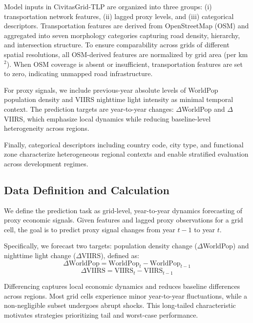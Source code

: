 \documentclass[11pt,conference,onecolumn]{IEEEtran}
\begin{document}
Model inputs in CivitasGrid-TLP are organized into three groups: (i) transportation network features, (ii) lagged proxy levels, and (iii) categorical descriptors. Transportation features are derived from OpenStreetMap (OSM) and aggregated into seven morphology categories capturing road density, hierarchy, and intersection structure. To ensure comparability across grids of different spatial resolutions, all OSM-derived features are normalized by grid area (per km$^2$). When OSM coverage is absent or insufficient, transportation features are set to zero, indicating unmapped road infrastructure.

For proxy signals, we include previous-year absolute levels of WorldPop population density and VIIRS nighttime light intensity as minimal temporal context. The prediction targets are year-to-year changes: $\Delta$WorldPop and $\Delta$VIIRS, which emphasize local dynamics while reducing baseline-level heterogeneity across regions.

Finally, categorical descriptors including country code, city type, and functional zone characterize heterogeneous regional contexts and enable stratified evaluation across development regimes.



\subsection{Data Definition and Calculation}

We define the prediction task as grid-level, year-to-year dynamics forecasting of proxy economic signals. Given features and lagged proxy observations for a grid cell, the goal is to predict proxy signal changes from year $t-1$ to year $t$.

Specifically, we forecast two targets: population density change ($\Delta$WorldPop) and nighttime light change ($\Delta$VIIRS), defined as:
\begin{equation}
    \Delta \text{WorldPop} = \text{WorldPop}_t - \text{WorldPop}_{t-1}
\end{equation}
\begin{equation}
        \Delta \text{VIIRS} = \text{VIIRS}_t - \text{VIIRS}_{t-1}
\end{equation}

Differencing captures local economic dynamics and reduces baseline differences across regions. Most grid cells experience minor year-to-year fluctuations, while a non-negligible subset undergoes abrupt shocks. This long-tailed characteristic motivates strategies prioritizing tail and worst-case performance.
\end{document}

